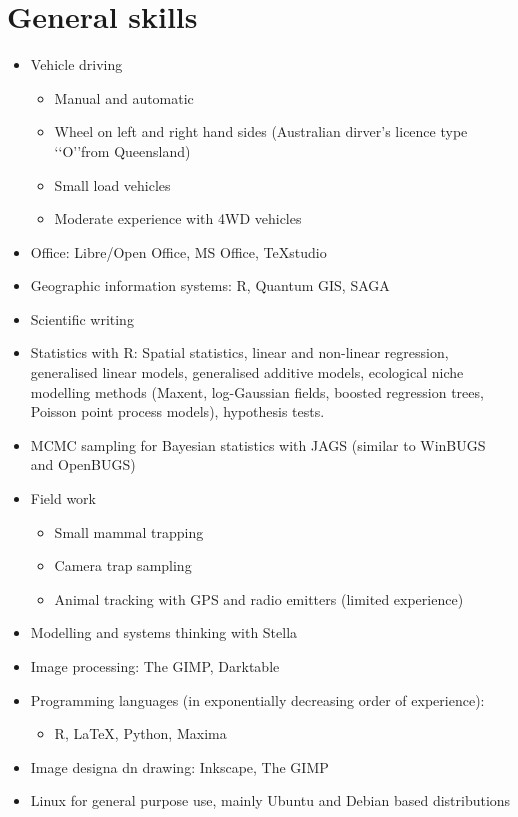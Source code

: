 \documentclass[12pt, a4paper]{article}
\begin{document}
\section*{General skills}
\begin{itemize}
\item Vehicle driving
\begin{itemize}
	\item Manual and automatic
	\item Wheel on left and right hand sides (Australian dirver's licence type \lq\lq O\rq\rq from Queensland)
	\item Small load vehicles
	\item Moderate experience with 4WD vehicles
\end{itemize}
\item Office: Libre/Open Office, MS Office, \TeX studio
\item Geographic information systems: R, Quantum GIS, SAGA
\item Scientific writing
\item Statistics with R: Spatial statistics, linear and non-linear regression, generalised linear models, generalised additive models, ecological niche modelling methods (Maxent, log-Gaussian fields, boosted regression trees, Poisson point process models), hypothesis tests.
\item MCMC sampling for Bayesian statistics with JAGS (similar to WinBUGS and OpenBUGS)
\item Field work
\begin{itemize}
	\item Small mammal trapping
	\item Camera trap sampling
	\item Animal tracking with GPS and radio emitters (limited experience)
\end{itemize}
\item Modelling and systems thinking with Stella
\item Image processing: The GIMP, Darktable
\item Programming languages (in exponentially decreasing order of experience):
\begin{itemize}
	\item R, \LaTeX, Python, Maxima
\end{itemize}	\item Image designa dn drawing: Inkscape, The GIMP
\item Linux for general purpose use, mainly Ubuntu and Debian based distributions
\end{itemize}
\end{document}
